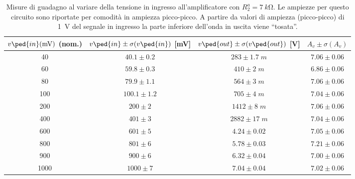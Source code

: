 \documentclass[10pt, a4paper, italian]{article}
\begin{document}
\begin{table}[htbp]
\centering
\begin{tabular}{cccc}
\toprule
$v\ped{in}(\si{m\V})$ (nom.) & $v\ped{in} \pm \sigma(v\ped{in})$ [mV] & $v\ped{out} \pm \sigma(v\ped{out})$ [V] & $A_v \pm \sigma(A_v)$ \\
\midrule
\midrule
40 & $40.1 \pm 0.2$ & $283 \pm 1.7 \; \si{m}$ & $7.06 \pm 0.06$ \\
60 & $59.8 \pm 0.3$ & $410 \pm 2 \; \si{m}$ & $6.86 \pm 0.06$ \\
80 & $79.9 \pm 1.1$ & $564 \pm 3 \; \si{m}$ & $7.06 \pm 0.06$ \\
100 & $100.1 \pm 1.2$ & $705 \pm 4 \; \si{m}$ & $7.04 \pm 0.06$ \\
200 & $200 \pm 2$ & $1412 \pm 8 \; \si{m}$ & $7.06 \pm 0.06$ \\
400 & $401 \pm 3$ & $2882 \pm 17 \; \si{m}$ & $7.04 \pm 0.06$ \\
600 & $601 \pm 5$ & $4.24 \pm 0.02$ & $7.05 \pm 0.06$ \\
800 & $801 \pm 6$ & $5.78 \pm 0.03$ & $7.21 \pm 0.06$ \\
900 & $900 \pm 6$ & $6.32 \pm 0.04$ & $7.00 \pm 0.06$ \\
1000 & $1000 \pm 7$ & $7.04 \pm 0.04$ & $7.02 \pm 0.06$ \\
\bottomrule
\end{tabular} 
\caption{Misure di guadagno al variare della tensione in ingresso
all'amplificatore con $R_2^a = \SI{7}{k\ohm}$. Le ampiezze per questo
circuito sono riportate per comodità in ampiezza picco-picco. A partire
da valori di ampiezza (picco-picco) di \SI{1}{\V} del segnale in ingresso la
parte inferiore dell'onda in uscita viene ``tosata''. \label{tab: gain_M}}
\end{table}
\end{document}
